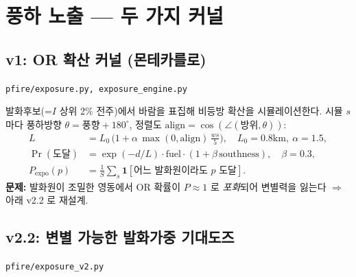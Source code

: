 \documentclass[11pt,a4paper]{article}
\newcommand{\src}[1]{{\footnotesize\color{gray}\texttt{#1}}}
\begin{document}
\section{풍하 노출 — 두 가지 커널}

\subsection{v1: OR 확산 커널 (몬테카를로)}
\src{pfire/exposure.py, exposure\_engine.py}

발화후보(=$I$ 상위 2\% 전주)에서 바람을 표집해 비등방 확산을 시뮬레이션한다. 시뮬 $s$
마다 풍하방향 $\theta=\text{풍향}+180^\circ$, 정렬도 $\mathrm{align}=\cos(\angle(\text{방위},\theta))$:
\begin{align}
L &= L_0\,\big(1+\alpha\,\max(0,\mathrm{align})\,\tfrac{ws}{5}\big),\quad L_0{=}0.8\text{km},\ \alpha{=}1.5,\\
\Pr(\text{도달})&=\exp(-d/L)\cdot \mathrm{fuel}\cdot(1+\beta\,\mathrm{southness}),\quad \beta{=}0.3,\\
P_{\text{expo}}(p)&=\frac{1}{S}\textstyle\sum_{s}\mathbf{1}[\text{어느 발화원이라도 } p \text{ 도달}].
\end{align}
\textbf{문제:} 발화원이 조밀한 영동에서 OR 확률이 $P\approx1$ 로 \emph{포화}되어 변별력을
잃는다 $\Rightarrow$ 아래 v2.2 로 재설계.

\subsection{v2.2: 변별 가능한 발화가중 기대도즈}
\src{pfire/exposure\_v2.py}
\end{document}
